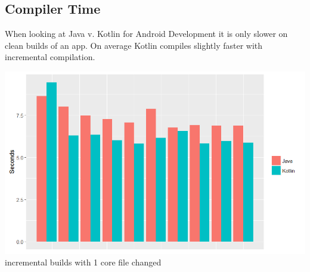 \subsection{Compiler Time}
\hspace{1em}When looking at Java v. Kotlin for Android Development it is only slower on clean builds of an app. On average Kotlin compiles slightly faster with incremental compilation.
\vspace{1em}
\begin{center}
	\includegraphics[scale=0.3]{kot}
	\\
	incremental builds with 1 core file changed 
\end{center}